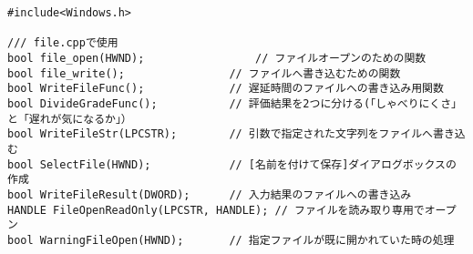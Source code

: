 \begin{lstlisting}[caption=file.h]
#include<Windows.h>

/// file.cppで使用
bool file_open(HWND);                 // ファイルオープンのための関数
bool file_write();                // ファイルへ書き込むための関数
bool WriteFileFunc();             // 遅延時間のファイルへの書き込み用関数
bool DivideGradeFunc();           // 評価結果を2つに分ける(「しゃべりにくさ」と「遅れが気になるか」）
bool WriteFileStr(LPCSTR);        // 引数で指定された文字列をファイルへ書き込む
bool SelectFile(HWND);            // [名前を付けて保存]ダイアログボックスの作成
bool WriteFileResult(DWORD);      // 入力結果のファイルへの書き込み
HANDLE FileOpenReadOnly(LPCSTR, HANDLE); // ファイルを読み取り専用でオープン
bool WarningFileOpen(HWND);       // 指定ファイルが既に開かれていた時の処理
\end{lstlisting}

